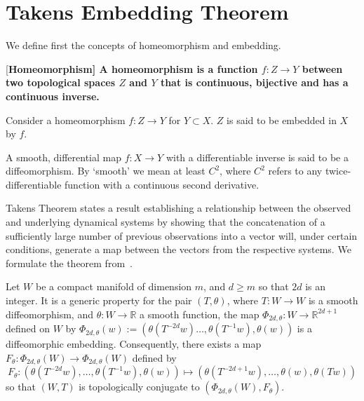 \section{Takens Embedding Theorem}\label{sect_Takens}

We define first the concepts of homeomorphism and embedding.
\begin{Definition} \rm
  [\bf {Homeomorphism}]\label{Dfn_homeo}\rm
  A homeomorphism is a function $f:Z\rightarrow Y$ between two topological spaces $Z$ and $Y$ that is continuous, bijective and has a continuous inverse. 
\end{Definition}

\begin{Definition}
  [\bf{Embedding}]\label{Dfn_embed}\rm
  Consider a homeomorphism $f:Z\rightarrow Y$ for $Y\subset X$. $Z$ is said to be embedded in $X$ by $f$.
\end{Definition}

\begin{Definition}
  [\bf{Diffeomorphism}]\label{Dfn_diffeo}\rm
  A smooth, differential map $f:X\to{Y}$ with a differentiable inverse is said to be a diffeomorphism. By `smooth' we mean at least $C^2$, where $C^2$ refers to any twice-differentiable function  with a continuous second derivative.
\end{Definition}

Takens Theorem states a result establishing a relationship between the observed and underlying dynamical systems by showing that the concatenation of a sufficiently large number of previous observations into a vector will, under certain conditions, generate a map between the vectors from the respective systems.  We formulate the theorem from~\cite{takens1981detecting}.  

\begin{Theorem} 
	\label{Thm_Takens}
         Let $W$ be a compact manifold of dimension $m$, and $d\ge m$ so that $2d$ is an integer. It is a 
            generic property for the pair $(T, \theta)$,  where $T:W \to W$ is
            a smooth diffeomorphism, and $\theta:W \to \mathbb{R}$ a smooth function, the map $\Phi_{2d,\theta}:W \to \mathbb{R}^{2d+1}$ defined on $W$ by 
            $\Phi_{2d,\theta}(w) := (\theta(T^{-2d}w)\ldots,\theta(T^{-1}w),\theta(w))$
            is a diffeomorphic embedding. Consequently, there exists a map $F_\theta: \Phi_{2d,\theta}(W) \to \Phi_{2d,\theta}(W)$ defined by \[F_\theta: (\theta(T^{-2d}w),\ldots,\theta(T^{-1}w),\theta(w)) \mapsto 
            (\theta(T^{-2d+1}w),\ldots,\theta(w),\theta(Tw)) \]
           so that $(W,T)$ is topologically conjugate to 
            $(\Phi_{2d,\theta}(W), F_\theta)$.    
\end{Theorem} 


